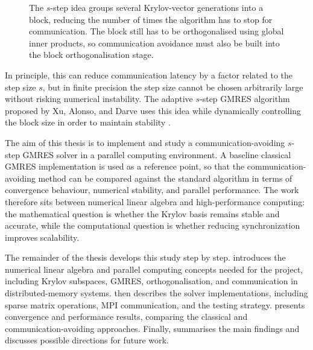 \begin{figure}[h]
{}
    \caption{The \(s\)-step idea groups several Krylov-vector generations into a block, reducing the number of times the algorithm has to stop for communication. The block still has to be orthogonalised using global inner products, so communication avoidance must also be built into the block orthogonalisation stage.}
    \label{fig:s-step-communication-avoidance}
\end{figure}

In principle, this can reduce communication latency by a factor related to the step size \(s\), but in finite precision the step size cannot be chosen arbitrarily large without risking numerical instability. The adaptive \(s\)-step GMRES algorithm proposed by Xu, Alonso, and Darve uses this idea while dynamically controlling the block size in order to maintain stability \cite{xu-2023}.

The aim of this thesis is to implement and study a communication-avoiding \(s\)-step GMRES solver in a parallel computing environment. A baseline classical GMRES implementation is used as a reference point, so that the communication-avoiding method can be compared against the standard algorithm in terms of convergence behaviour, numerical stability, and parallel performance. The work therefore sits between numerical linear algebra and high-performance computing: the mathematical question is whether the Krylov basis remains stable and accurate, while the computational question is whether reducing synchronization improves scalability.

The remainder of the thesis develops this study step by step.  introduces the numerical linear algebra and parallel computing concepts needed for the project, including Krylov subspaces, GMRES, orthogonalisation, and communication in distributed-memory systems.  then describes the solver implementations, including sparse matrix operations, MPI communication, and the testing strategy.  presents convergence and performance results, comparing the classical and communication-avoiding approaches. Finally,  summarises the main findings and discusses possible directions for future work.
